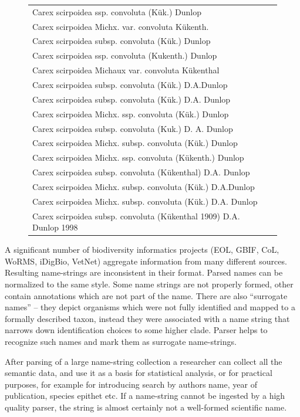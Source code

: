 \documentclass{bmcart}
\begin{document}
\begin{figure}[h!]
\begin{tabular}{| l | c |}
  Carex scirpoidea ssp. convoluta (Kük.) Dunlop & \\
  Carex scirpoidea Michx. var. convoluta Kükenth. & \\
  Carex scirpoidea subsp. convoluta (Kük.) Dunlop & \\
  Carex scirpoidea ssp. convoluta (Kukenth.) Dunlop & \\
  Carex scirpoidea Michaux var. convoluta Kükenthal & \\
  Carex scirpoidea subsp. convoluta (Kük.) D.A.Dunlop & \\
  Carex scirpoidea subsp. convoluta (Kük.) D.A. Dunlop & \\
  Carex scirpoidea Michx. ssp. convoluta (Kük.) Dunlop & \\
  Carex scirpoidea subsp. convoluta (Kuk.) D. A. Dunlop & \\
  Carex scirpoidea Michx. subsp. convoluta (Kük.) Dunlop & \\
  Carex scirpoidea Michx. ssp. convoluta (Kükenth.) Dunlop & \\
  Carex scirpoidea subsp. convoluta (Kükenthal) D.A. Dunlop & \\
  Carex scirpoidea Michx. subsp. convoluta (Kük.) D.A.Dunlop & \\
  Carex scirpoidea Michx. subsp. convoluta (Kük.) D.A. Dunlop & \\
  Carex scirpoidea subsp. convoluta (Kükenthal 1909) D.A. Dunlop 1998 & \\
  \hline
  \end{tabular}
\end{figure}

A significant number of biodiversity informatics projects (EOL, GBIF, CoL,
WoRMS, iDigBio, VetNet) aggregate information from many different sources.
Resulting name-strings are inconsistent in their format. Parsed names can be
normalized to the same style. Some name strings are not properly formed, other
contain annotations which are not part of the name. There are also “surrogate
names” -- they depict organisms which were not fully identified and mapped to a
formally described taxon, instead they were associated with a name string that
narrows down identification choices to some higher clade. Parser helps to
recognize such names and mark them as surrogate name-strings.

After parsing of a large name-string collection a researcher can collect all
the semantic data, and use it as a basis for statistical analysis, or for
practical purposes, for example for introducing search by authors name, year of
publication, species epithet etc. If a name-string cannot be ingested by a high
quality parser, the string is almost certainly not a well-formed scientific
name.
\end{document}
